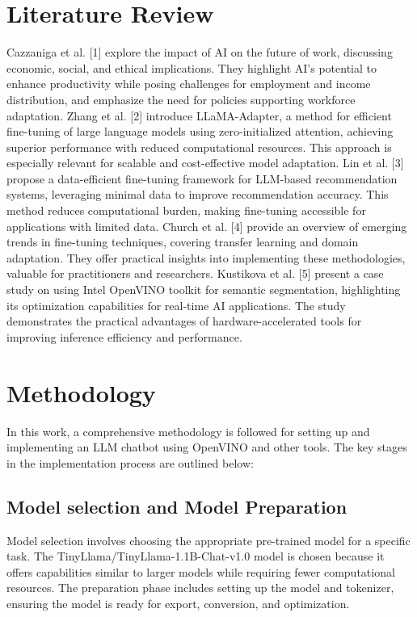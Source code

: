 \documentclass{josis}
\begin{document}
\section{Literature Review}
Cazzaniga et al. [1] explore the impact of AI on the future of work, discussing economic, social, and ethical implications. They highlight AI's potential to enhance productivity while posing challenges for employment and income distribution, and emphasize the need for policies supporting workforce adaptation. Zhang et al. [2] introduce LLaMA-Adapter, a method for efficient fine-tuning of large language models using zero-initialized attention, achieving superior performance with reduced computational resources. This approach is especially relevant for scalable and cost-effective model adaptation. Lin et al. [3] propose a data-efficient fine-tuning framework for LLM-based recommendation systems, leveraging minimal data to improve recommendation accuracy. This method reduces computational burden, making fine-tuning accessible for applications with limited data. Church et al. [4] provide an overview of emerging trends in fine-tuning techniques, covering transfer learning and domain adaptation. They offer practical insights into implementing these methodologies, valuable for practitioners and researchers. Kustikova et al. [5] present a case study on using Intel\textregistered{} OpenVINO\texttrademark{} toolkit for semantic segmentation, highlighting its optimization capabilities for real-time AI applications. The study demonstrates the practical advantages of hardware-accelerated tools for improving inference efficiency and performance.


\section{Methodology}
In this work, a comprehensive methodology is followed for setting up and implementing an LLM chatbot using OpenVINO and other tools. The key stages in the implementation process are outlined below:
\subsection{Model selection and Model Preparation }
\begin{enumerate}
Model selection involves choosing the appropriate pre-trained model for a specific task. The TinyLlama/TinyLlama-1.1B-Chat-v1.0 model is chosen because it offers capabilities similar to larger models while requiring fewer computational resources. The preparation phase includes setting up the model and tokenizer, ensuring the model is ready for export, conversion, and optimization.
\end{enumerate}
\end{document}
